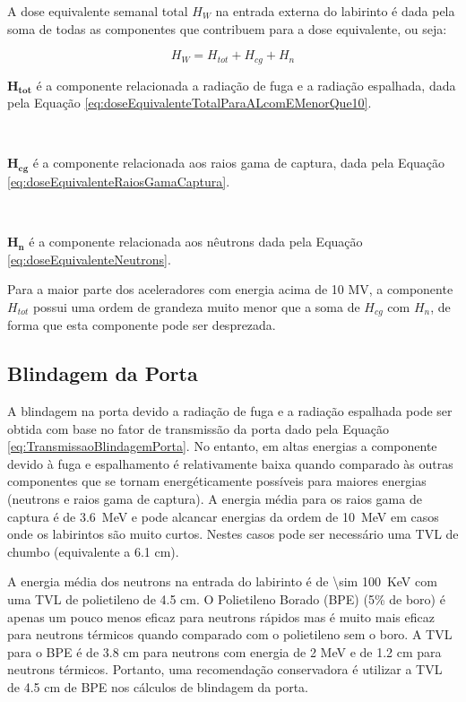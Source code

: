\documentclass[11pt,a4paper]{article}
\newcounter{exemplo}
\begin{document}
        A dose equivalente semanal total $H_W$ na entrada externa do labirinto é dada pela soma de todas as componentes que contribuem para a dose equivalente, ou seja:

        \begin{equation}
            H_W = H_{tot} + H_{cg} + H_{n}
        \end{equation}

        \begin{exemplo}[onde:]
            \textcolor{CarnationPink}{$\mathbf{H_{tot}}$} é a componente relacionada a radiação de fuga e a radiação espalhada, dada pela Equação \ref{eq:doseEquivalenteTotalParaALcomEMenorQue10}.

            \

            \textcolor{CarnationPink}{$\mathbf{H_{cg}}$} é a componente relacionada aos raios gama de captura, dada pela Equação \ref{eq:doseEquivalenteRaiosGamaCaptura}.

            \

            \textcolor{CarnationPink}{$\mathbf{H_n}$} é a componente relacionada aos nêutrons dada pela Equação \ref{eq:doseEquivalenteNeutrons}.
        \end{exemplo}

        Para a maior parte dos aceleradores com energia acima de 10 MV, a componente $H_{tot}$ possui uma ordem de grandeza muito menor que a soma de $H_{cg}$ com $H_n$, de forma que esta componente pode ser desprezada.

    \subsection{Blindagem da Porta}

        A blindagem na porta devido a radiação de fuga e a radiação espalhada pode ser obtida com base no fator de transmissão da porta dado pela Equação \ref{eq:TransmissaoBlindagemPorta}. No entanto, em altas energias a componente devido à fuga e espalhamento é relativamente baixa quando comparado às outras componentes que se tornam energéticamente possíveis para maiores energias (neutrons e raios gama de captura). A energia média para os raios gama de captura é de \qty{3.6}{MeV} e pode alcancar energias da ordem de \qty{10}{MeV} em casos onde os labirintos são muito curtos. Nestes casos pode ser necessário uma TVL de chumbo (equivalente a 6.1 cm). 

        A energia média dos neutrons na entrada do labirinto é de \qty{\sim 100}{KeV} com uma TVL de polietileno de 4.5 cm. O Polietileno Borado (BPE) (5\% de boro) é apenas um pouco menos eficaz para neutrons rápidos mas é muito mais eficaz para neutrons térmicos quando comparado com o polietileno sem o boro.  A TVL para o BPE é de 3.8 cm para neutrons com energia de 2 MeV e de 1.2 cm para neutrons térmicos. Portanto, uma recomendação conservadora é utilizar a TVL de 4.5 cm de BPE nos cálculos de blindagem da porta.
\end{document}
